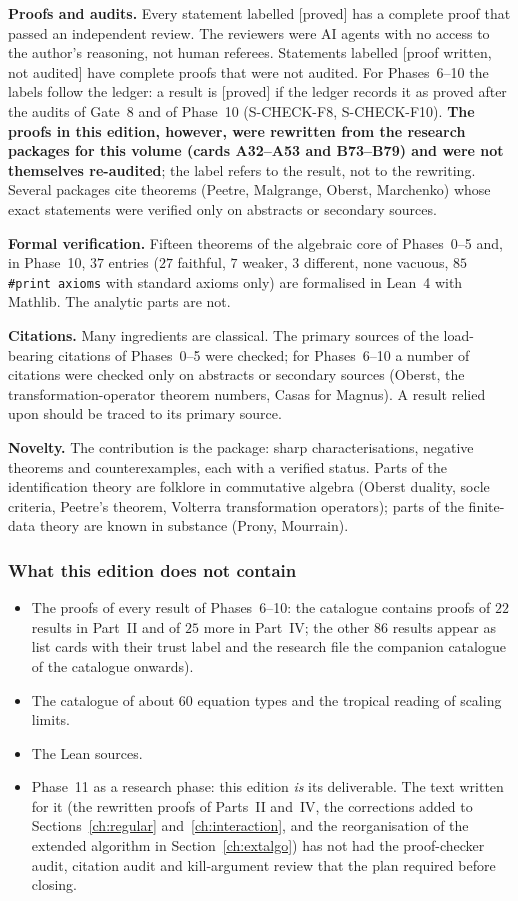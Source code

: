 \documentclass[11pt]{article}
\theoremstyle{plain}
\theoremstyle{definition}
\theoremstyle{remark}
\newcommand{\badge}[2]{\textcolor{#1}{\textsf{\footnotesize[#2]}}}
\newcommand{\proved}[1][]{\badge{cC}{proved#1}}
\newcommand{\pw}{\badge{cD}{proof written, not audited}}
\begin{document}
\textbf{Proofs and audits.} Every statement labelled \proved{} has a complete proof that passed an independent review. The reviewers were AI agents with no access to the author's reasoning, not human referees. Statements labelled \pw{} have complete proofs that were not audited. For Phases~6--10 the labels follow the ledger: a result is \proved{} if the ledger records it as proved after the audits of Gate~8 and of Phase~10 (S-CHECK-F8, S-CHECK-F10). \textbf{The proofs in this edition, however, were rewritten from the research packages for this volume (cards A32--A53 and B73--B79) and were not themselves re-audited}; the label refers to the result, not to the rewriting. Several packages cite theorems (Peetre, Malgrange, Oberst, Marchenko) whose exact statements were verified only on abstracts or secondary sources.

\textbf{Formal verification.} Fifteen theorems of the algebraic core of Phases~0--5 and, in Phase~10, $37$ entries ($27$ faithful, $7$ weaker, $3$ different, none vacuous, $85$ \texttt{\#print axioms} with standard axioms only) are formalised in Lean~4 with Mathlib. The analytic parts are not.

\textbf{Citations.} Many ingredients are classical. The primary sources of the load-bearing citations of Phases~0--5 were checked; for Phases~6--10 a number of citations were checked only on abstracts or secondary sources (Oberst, the transformation-operator theorem numbers, Casas for Magnus). A result relied upon should be traced to its primary source.

\textbf{Novelty.} The contribution is the package: sharp characterisations, negative theorems and counterexamples, each with a verified status. Parts of the identification theory are folklore in commutative algebra (Oberst duality, socle criteria, Peetre's theorem, Volterra transformation operators); parts of the finite-data theory are known in substance (Prony, Mourrain).

\subsubsection{What this edition does not contain}

\begin{itemize}
\item The proofs of every result of Phases~6--10: the catalogue contains proofs of $22$ results in Part~II and of $25$ more in Part~IV; the other $86$ results appear as list cards with their trust label and the research file the companion catalogue of the catalogue onwards).
\item The catalogue of about $60$ equation types and the tropical reading of scaling limits.
\item The Lean sources.
\item Phase~11 as a research phase: this edition \emph{is} its deliverable. The text written for it (the rewritten proofs of Parts~II and~IV, the corrections added to Sections~\ref{ch:regular} and~\ref{ch:interaction}, and the reorganisation of the extended algorithm in Section~\ref{ch:extalgo}) has not had the proof-checker audit, citation audit and kill-argument review that the plan required before closing.
\end{itemize}
\end{document}
